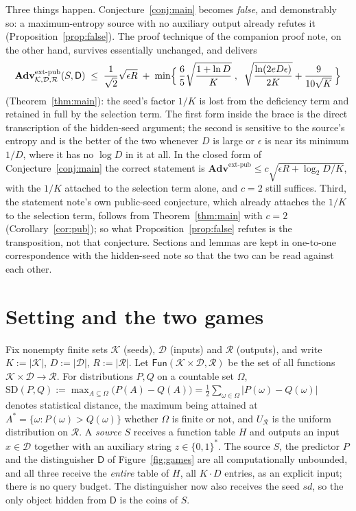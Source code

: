 \documentclass{conjura-solution}
\newcommand{\Fun}{\mathsf{Fun}}
\newcommand{\Adv}{\mathbf{Adv}}
\newcommand{\extp}{\mathrm{ext}\text{-}\mathrm{pub}}
\newcommand{\sd}{\mathit{sd}}
\newcommand{\SD}{\mathrm{SD}}
\newcommand{\calK}{\mathcal{K}}
\newcommand{\calD}{\mathcal{D}}
\newcommand{\calR}{\mathcal{R}}
\theoremstyle{cjplain}
\begin{document}
\noindent
Three things happen. Conjecture~\ref{conj:main} becomes \emph{false}, and demonstrably so: a
maximum-entropy source with no auxiliary output already refutes it
(Proposition~\ref{prop:false}). The proof technique of the companion proof note, on the other
hand, survives essentially unchanged, and delivers
\[
  \Adv^{\extp}_{\calK,\calD,\calR}(S,\mathsf{D})
  \;\le\; \frac{1}{\sqrt{2}}\sqrt{\epsilon R}
  \;+\; \min\Bigl\{\, \frac{6}{5}\sqrt{\frac{1 + \ln D}{K}} \;,\;\;
        \sqrt{\frac{\ln(2eD\epsilon)}{2K}} + \frac{9}{10\sqrt{K}} \,\Bigr\}
\]
(Theorem~\ref{thm:main}): the seed's factor $1/K$ is lost from the deficiency term and retained in
full by the selection term. The first form inside the brace is the direct transcription of the
hidden-seed argument; the second is sensitive to the source's entropy and is the better of the two
whenever $D$ is large or $\epsilon$ is near its minimum $1/D$, where it has no $\log D$ in it at
all. In the closed form of Conjecture~\ref{conj:main} the correct statement is
$\Adv^{\extp} \le c\sqrt{\epsilon R + \log_2 D / K}$, with the $1/K$ attached to the selection term
alone, and $c = 2$ still suffices. Third, the statement note's own public-seed conjecture, which
already attaches the $1/K$ to the selection term, follows from Theorem~\ref{thm:main} with
$c = 2$ (Corollary~\ref{cor:pub}); so what
Proposition~\ref{prop:false} refutes is the transposition, not that conjecture. Sections and lemmas are kept in one-to-one correspondence with
the hidden-seed note so that the two can be read against each other.

\section{Setting and the two games}\label{sec:setting}

Fix nonempty finite sets $\calK$ (seeds), $\calD$ (inputs) and $\calR$ (outputs), and write
$K := |\calK|$, $D := |\calD|$, $R := |\calR|$. Let $\Fun(\calK \times \calD, \calR)$ be the set of
all functions $\calK \times \calD \to \calR$. For distributions $P, Q$ on a countable set $\Omega$,
\(
  \SD(P,Q) := \max_{A \subseteq \Omega}\bigl(P(A) - Q(A)\bigr)
            = \tfrac12 \sum_{\omega \in \Omega} |P(\omega) - Q(\omega)|
\)
denotes statistical distance, the maximum being attained at
$A^{*} = \{\omega : P(\omega) > Q(\omega)\}$ whether $\Omega$ is finite or not, and $U_{\calR}$ is the uniform distribution on $\calR$. A
\emph{source} $S$ receives a function table $H$ and outputs an input $x \in \calD$ together with an
auxiliary string $z \in \{0,1\}^{*}$. The source $S$, the predictor $P$ and the distinguisher $\mathsf{D}$ of
Figure~\ref{fig:games} are all computationally unbounded, and all three receive the \emph{entire}
table of $H$, all $K \cdot D$ entries, as an explicit input; there is no query budget. The
distinguisher now also receives the seed $\sd$, so the only object hidden from $\mathsf{D}$ is the
coins of $S$.
\end{document}
